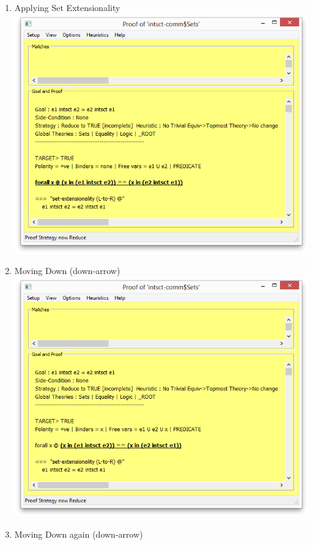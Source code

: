 \begin{enumerate}
  \newpage
  \item Applying Set Extensionality
  \\\includegraphics[scale=0.5]{SCREENSHOTS/09-extensionality-applied.png}
  \item Moving Down (down-arrow)
  \\\includegraphics[scale=0.5]{SCREENSHOTS/10-moving-down.png}
  \newpage
  \item Moving Down again (down-arrow)

\end{enumerate}
